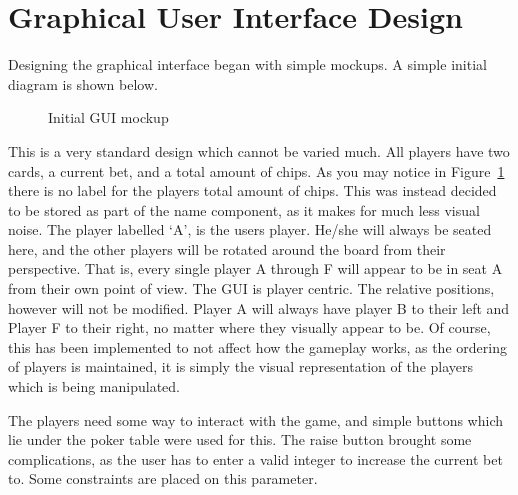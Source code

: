 \section{Graphical User Interface Design}
Designing the graphical interface began with simple mockups. A simple
initial diagram is shown below.

\begin{figure}[h]
    \caption{Initial GUI mockup}%
    \label{fig:initialgui}
\end{figure}

This is a very standard design which cannot be varied much. All players have
two cards, a current bet, and a total amount of chips. As you may notice
in Figure~\ref{fig:initialgui} there is no label for the players total amount
of chips. This was instead decided to be stored as part of the name component,
as it makes for much less visual noise. The player labelled `A', is the
users player. He/she will always be seated here, and the other players will
be rotated around the board from their perspective. That is, every single
player A through F will appear to be in seat A from their own point of view.
The GUI is player centric. The relative positions, however will not be 
modified. Player A will always have player B to their left and Player F to 
their right, no matter where they visually appear to be. Of course, this has 
been implemented to not affect how the gameplay works, as the ordering of 
players is maintained, it is simply the visual representation of the players 
which is being manipulated.

The players need some way to interact with the game, and simple buttons which 
lie under the poker table were used for this. The raise button brought some 
complications, as the user has to enter a valid integer to increase the current
bet to. Some constraints are placed on this parameter.

